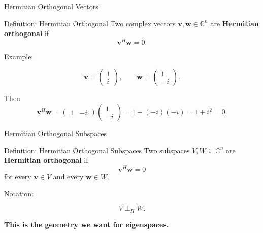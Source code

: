 \documentclass[10pt]{beamer}
\theoremstyle{definition}
\newcommand{\x}[1]{\alert{\textbf{#1}}}
\begin{document}
\begin{frame}{Hermitian Orthogonal Vectors}

\begin{block}{Definition: Hermitian Orthogonal}
Two complex vectors $\mathbf{v},\mathbf{w}\in\mathbb{C}^n$ are \x{Hermitian orthogonal} if
$$
\mathbf{v}^H\mathbf{w}=0.
$$
\end{block}

\vfill

Example:

$$
\mathbf{v}=\begin{pmatrix}1\\ i\end{pmatrix},
\qquad
\mathbf{w}=\begin{pmatrix}1\\ -i\end{pmatrix}.
$$

\vfill\pause

Then
$$
\mathbf{v}^H\mathbf{w}
=\begin{pmatrix}1&-i\end{pmatrix}
\begin{pmatrix}1\\ -i\end{pmatrix}
=1+(-i)(-i)=1+i^2=0.
$$

\end{frame}


\begin{frame}{Hermitian Orthogonal Subspaces}

\begin{block}{Definition: Hermitian Orthogonal Subspaces}
Two subspaces $V,W\subseteq\mathbb{C}^n$ are \x{Hermitian orthogonal} if
$$
\mathbf{v}^H\mathbf{w}=0
$$
for every $\mathbf{v}\in V$ and every $\mathbf{w}\in W$.
\end{block}

\vfill

Notation:

$$
V\perp_H W.
$$

\vfill

\x{This is the geometry we want for eigenspaces.}

\end{frame}


\end{document}
